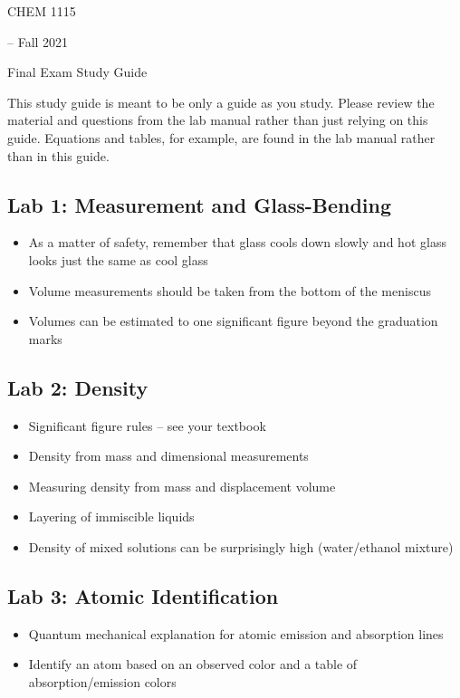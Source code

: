 \documentclass[12pt, letterpaper]{memoir}
\begin{document}
	\mainmatter
	
	\begin{center}
		{\Huge CHEM 1115}
		{\LARGE-- Fall 2021
		
		Final Exam Study Guide}
	\end{center}
	
	This study guide is meant to be only a guide as you study. Please review the material and questions from the lab manual rather than just relying on this guide. Equations and tables, for example, are found in the lab manual rather than in this guide.
	
	\subsection*{Lab 1: Measurement and Glass-Bending}	
	\begin{itemize}
		\item As a matter of safety, remember that glass cools down slowly and hot glass looks just the same as cool glass
		\item Volume measurements should be taken from the bottom of the meniscus
		\item Volumes can be estimated to one significant figure beyond the graduation marks
	\end{itemize}

	\subsection*{Lab 2: Density}
	\begin{itemize}
		\item Significant figure rules -- see your textbook
		\item Density from mass and dimensional measurements
		\item Measuring density from mass and displacement volume
		\item Layering of immiscible liquids
		\item Density of mixed solutions can be surprisingly high (water/ethanol mixture)
	\end{itemize}
	
	\subsection*{Lab 3: Atomic Identification}
	\begin{itemize}
		\item Quantum mechanical explanation for atomic emission and absorption lines
		\item Identify an atom based on an observed color and a table of absorption/emission colors
	\end{itemize}
	
\end{document}
